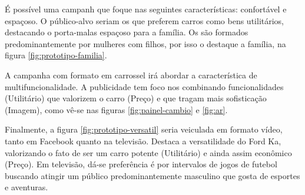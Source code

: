 É possível uma campanh que foque nas seguintes características: confortável
e espaçoso. O público-alvo seriam os \nomeCd{} que preferem carros
como bens utilitários, destacando o porta-malas espaçoso para a família.
Os \nomeCd{} são formados predominantemente por mulheres com filhos,
por isso o destaque a família, na figura \ref{fig:prototipo-familia}.

A campanha com formato em carrossel irá abordar a característica de
multifuncionalidade. A publicidade tem foco nos \nomeCa{} combinando
funcionalidades (Utilitário) que valorizem o carro (Preço) e que tragam
mais sofisticação (Imagem), como vê-se nas figuras \ref{fig:painel-cambio}
e \ref{fig:ar}.

Finalmente, a figura \ref{fig:prototipo-versatil} seria veiculada
em formato vídeo, tanto em Facebook quanto na televisão. Destaca a
versatilidade do Ford Ka\texttrademark, valorizando o fato de ser
um carro potente (Utilitário) e ainda assim econômico (Preço). Em
televisão, dá-se preferência é por intervalos de jogos de futebol
buscando atingir um público predominantemente masculino que gosta
de esportes e aventuras. 
